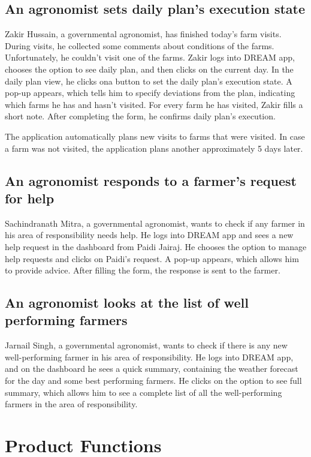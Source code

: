\subsection*{An agronomist sets daily plan's execution state}
Zakir Hussain, a governmental agronomist, has finished today's farm visits. During visits, he collected some comments about conditions of the farms. Unfortunately, he couldn't visit one of the farms. Zakir logs into DREAM app, chooses the option to see daily plan, and then clicks on the current day. In the daily plan view, he clicks ona button to set the daily plan's execution state. A pop-up appears, which tells him to specify deviations from the plan, indicating which farms he has and hasn't visited. For every farm he has visited, Zakir fills a short note. After completing the form, he confirms daily plan's execution.

The application automatically plans new visits to farms that were visited. In case a farm was not visited, the application plans another approximately 5 days later.

\subsection*{An agronomist responds to a farmer’s request for help} 
Sachindranath Mitra, a governmental agronomist, wants to check if any farmer in his area of responsibility needs help. He logs into DREAM app and sees a new help request in the dashboard from Paidi Jairaj. He chooses the option to manage help requests and clicks on Paidi's request. A pop-up appears, which allows him to provide advice. After filling the form, the response is sent to the farmer.

\subsection*{An agronomist looks at the list of well performing farmers}
Jarnail Singh, a governmental agronomist, wants to check if there is any new well-performing farmer in his area of responsibility. He logs into DREAM app, and on the dashboard he sees a quick summary, containing the weather forecast for the day and some best performing farmers. He clicks on the option to see full summary, which allows him to see a complete list of all the well-performing farmers in the area of responsibility. 

\section{Product Functions}

